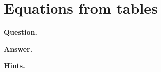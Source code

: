 \documentclass{article}
\begin{document}
\section*{Equations from tables}
\textbf{Question.} 

\textbf{Answer.} 

\textbf{Hints.}
\begin{itemize}

\end{itemize}
\end{document}
